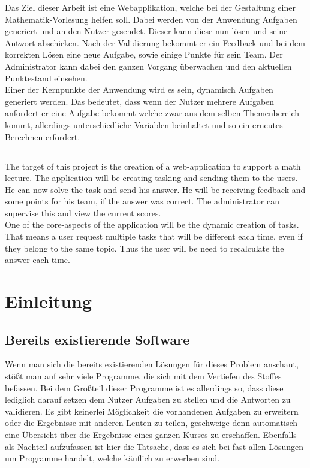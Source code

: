 Das Ziel dieser Arbeit ist eine Webapplikation, welche bei der Gestaltung einer Mathematik-Vorlesung helfen soll. Dabei werden von der Anwendung Aufgaben generiert und an den Nutzer gesendet. Dieser kann diese nun lösen und seine Antwort abschicken. Nach der Validierung bekommt er ein Feedback und bei dem korrekten Lösen eine neue Aufgabe, sowie einige Punkte für sein Team. Der Administrator kann dabei den ganzen Vorgang überwachen und den aktuellen Punktestand einsehen. \\
Einer der Kernpunkte der Anwendung wird es sein, dynamisch Aufgaben generiert werden. Das bedeutet, dass wenn der Nutzer mehrere Aufgaben anfordert er eine Aufgabe bekommt welche zwar aus dem selben Themenbereich kommt, allerdings unterschiedliche Variablen beinhaltet und so ein erneutes Berechnen erfordert. \\

\section*{\centering\abstractname}

The target of this project is the creation of a web-application to support a math lecture. The application will be creating tasking and sending them to the users. He can now solve the task and send his answer. He will be receiving feedback and some points for his team, if the answer was correct. The administrator can supervise this and view the current scores. \\
One of the core-aspects of the application will be the dynamic creation of tasks. That means a user request multiple tasks that will be different each time, even if they belong to the same topic. Thus the user will be need to recalculate the answer each time.



\chapter{Einleitung}

\section{Bereits existierende Software}

Wenn man sich die bereits existierenden Lösungen für dieses Problem anschaut, stößt man auf sehr viele Programme, die sich mit dem Vertiefen des Stoffes befassen. Bei dem Großteil dieser Programme ist es allerdings so, dass diese lediglich darauf setzen dem Nutzer Aufgaben zu stellen und die Antworten zu validieren. Es gibt keinerlei Möglichkeit die vorhandenen Aufgaben zu erweitern oder die Ergebnisse mit anderen Leuten zu teilen, geschweige denn automatisch eine Übersicht über die Ergebnisse eines ganzen Kurses zu erschaffen. Ebenfalls als Nachteil aufzufassen ist hier die Tatsache, dass es sich bei fast allen Lösungen um Programme handelt, welche käuflich zu erwerben sind.\\

